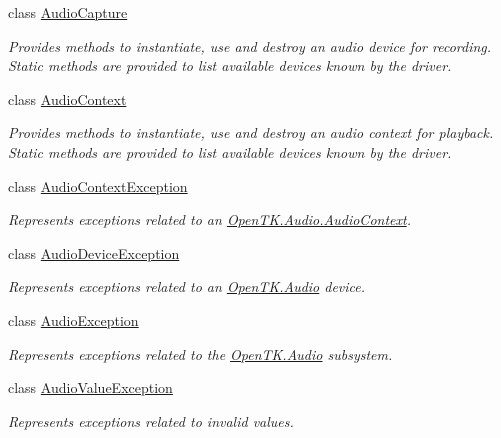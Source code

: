 \begin{DoxyCompactItemize}
\item 
class \hyperlink{class_open_t_k_1_1_audio_1_1_audio_capture}{Audio\-Capture}
\begin{DoxyCompactList}\small\item\em Provides methods to instantiate, use and destroy an audio device for recording. Static methods are provided to list available devices known by the driver. \end{DoxyCompactList}\item 
class \hyperlink{class_open_t_k_1_1_audio_1_1_audio_context}{Audio\-Context}
\begin{DoxyCompactList}\small\item\em Provides methods to instantiate, use and destroy an audio context for playback. Static methods are provided to list available devices known by the driver. \end{DoxyCompactList}\item 
class \hyperlink{class_open_t_k_1_1_audio_1_1_audio_context_exception}{Audio\-Context\-Exception}
\begin{DoxyCompactList}\small\item\em Represents exceptions related to an \hyperlink{class_open_t_k_1_1_audio_1_1_audio_context}{Open\-T\-K.\-Audio.\-Audio\-Context}.\end{DoxyCompactList}\item 
class \hyperlink{class_open_t_k_1_1_audio_1_1_audio_device_exception}{Audio\-Device\-Exception}
\begin{DoxyCompactList}\small\item\em Represents exceptions related to an \hyperlink{namespace_open_t_k_1_1_audio}{Open\-T\-K.\-Audio} device.\end{DoxyCompactList}\item 
class \hyperlink{class_open_t_k_1_1_audio_1_1_audio_exception}{Audio\-Exception}
\begin{DoxyCompactList}\small\item\em Represents exceptions related to the \hyperlink{namespace_open_t_k_1_1_audio}{Open\-T\-K.\-Audio} subsystem.\end{DoxyCompactList}\item 
class \hyperlink{class_open_t_k_1_1_audio_1_1_audio_value_exception}{Audio\-Value\-Exception}
\begin{DoxyCompactList}\small\item\em Represents exceptions related to invalid values.\end{DoxyCompactList}\end{DoxyCompactItemize}
